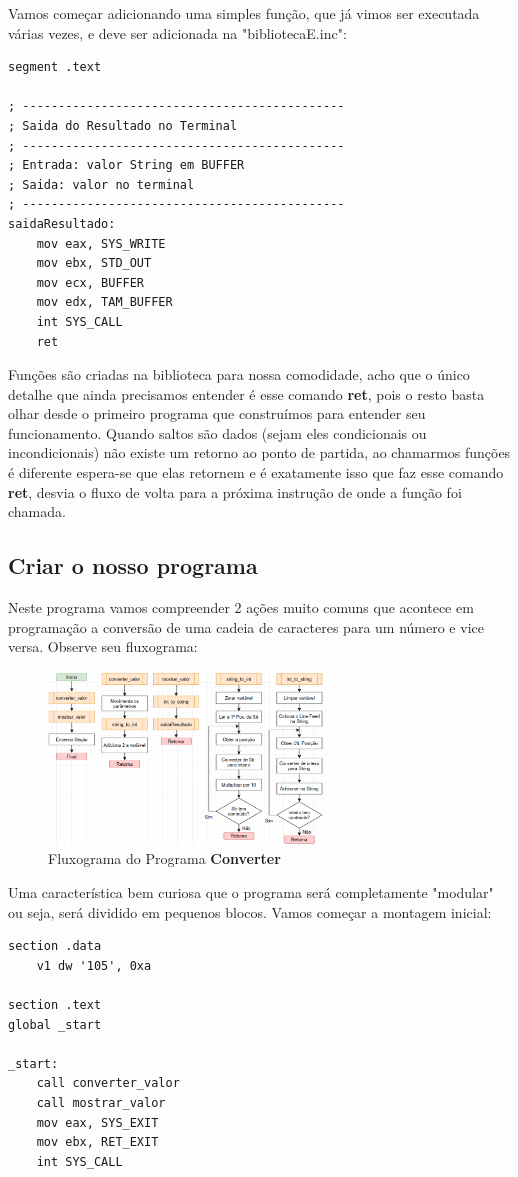 Vamos começar adicionando uma simples função, que já vimos ser executada várias vezes, e deve ser adicionada na "bibliotecaE.inc":

\begin{lstlisting}[]
segment .text

; ---------------------------------------------
; Saida do Resultado no Terminal
; ---------------------------------------------
; Entrada: valor String em BUFFER
; Saida: valor no terminal
; ---------------------------------------------
saidaResultado:
	mov eax, SYS_WRITE
	mov ebx, STD_OUT
	mov ecx, BUFFER
	mov edx, TAM_BUFFER
	int SYS_CALL
	ret
\end{lstlisting}

Funções são criadas na biblioteca para nossa comodidade, acho que o único detalhe que ainda precisamos entender é esse comando \textbf{ret}, pois o resto basta olhar desde o primeiro programa que construímos para entender seu funcionamento. Quando saltos são dados (sejam eles condicionais ou incondicionais) não existe um retorno ao ponto de partida, ao chamarmos funções é diferente espera-se que elas retornem e é exatamente isso que faz esse comando \textbf{ret}, desvia o fluxo de volta para a próxima instrução de onde a função foi chamada.

\subsection{Criar o nosso programa}
Neste programa vamos compreender 2 ações muito comuns que acontece em programação a conversão de uma cadeia de caracteres para um número e vice versa. Observe seu fluxograma:
\begin{figure}[H]
	\centering
	\includegraphics[width=0.65\textwidth]{Pictures/cap01/programa4}
	\caption{Fluxograma do Programa \textbf{Converter}}
\end{figure}

Uma característica bem curiosa que o programa será completamente "modular" ou seja, será dividido em pequenos blocos. Vamos começar a montagem inicial:
\begin{lstlisting}[]
section .data
	v1 dw '105', 0xa

section .text
global _start

_start:
	call converter_valor
	call mostrar_valor
	mov eax, SYS_EXIT
	mov ebx, RET_EXIT
	int SYS_CALL
\end{lstlisting}

